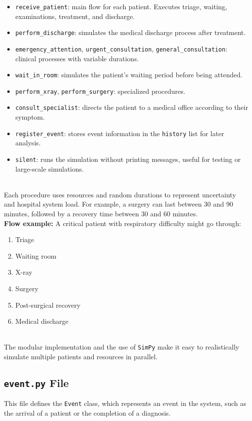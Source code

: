 \documentclass[a4paper,12pt]{article}
\begin{document}
\begin{itemize}
    \item \texttt{receive\_patient}: main flow for each patient. Executes triage, waiting, examinations, treatment, and discharge.
    \item \texttt{perform\_discharge}: simulates the medical discharge process after treatment.
    \item \texttt{emergency\_attention}, \texttt{urgent\_consultation}, \texttt{general\_consultation}: clinical processes with variable durations.
    \item \texttt{wait\_in\_room}: simulates the patient's waiting period before being attended.
    \item \texttt{perform\_xray}, \texttt{perform\_surgery}: specialized procedures.
    \item \texttt{consult\_specialist}: directs the patient to a medical office according to their symptom.
    \item \texttt{register\_event}: stores event information in the \texttt{history} list for later analysis.
    \item \texttt{silent}: runs the simulation without printing messages, useful for testing or large-scale simulations.
\end{itemize}
\\
Each procedure uses resources and random durations to represent uncertainty and hospital system load. For example, a surgery can last between 30 and 90 minutes, followed by a recovery time between 30 and 60 minutes.
\\
\textbf{Flow example:}
A critical patient with respiratory difficulty might go through:
\begin{enumerate}
    \item Triage
    \item Waiting room
    \item X-ray
    \item Surgery
    \item Post-surgical recovery
    \item Medical discharge
\end{enumerate}
\\
The modular implementation and the use of \texttt{SimPy} make it easy to realistically simulate multiple patients and resources in parallel.


\subsection{\texttt{event.py} File}
This file defines the \texttt{Event} class, which represents an event in the system, such as the arrival of a patient or the completion of a diagnosis.
\end{document}
